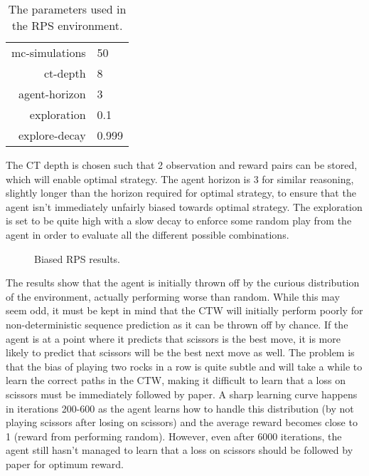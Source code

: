 \documentclass[pdftex,twoside,a4paper]{report}
\begin{document}
\begin{table}[h]
\begin{center}
\begin{tabular}{| r | l | }
\hline
mc-simulations & 50\\
ct-depth & 8\\
agent-horizon & 3\\
exploration & 0.1\\
explore-decay & 0.999\\
\hline
\end{tabular}
\caption{The parameters used in the RPS environment.}
\end{center}
\label{tab:rps_params}
\end{table}

The CT depth is chosen such that 2 observation and reward pairs can be stored, which will enable optimal strategy. The agent horizon is 3 for similar reasoning, slightly longer than the horizon required for optimal strategy, to ensure that the agent isn't immediately unfairly biased towards optimal strategy. The exploration is set to be quite high with a slow decay to enforce some random play from the agent in order to evaluate all the different possible combinations.

\begin{figure}[h]
  \begin{center}
  \end{center}
  \caption{Biased RPS results.}
  \label{fig:rps_results}
\end{figure}

The results show that the agent is initially thrown off by the curious distribution of the environment, actually performing worse than random. While this may seem odd, it must be kept in mind that the CTW will initially perform poorly for non-deterministic sequence prediction as it can be thrown off by chance. If the agent is at a point where it predicts that scissors is the best move, it is more likely to predict that scissors will be the best next move as well. The problem is that the bias of playing two rocks in a row is quite subtle and will take a while to learn the correct paths in the CTW, making it difficult to learn that a loss on scissors must be immediately followed by paper. A sharp learning curve happens in iterations 200-600 as the agent learns how to handle this distribution (by not playing scissors after losing on scissors) and the average reward becomes close to 1 (reward from performing random). However, even after 6000 iterations, the agent still hasn't managed to learn that a loss on scissors should be followed by paper for optimum reward.
\end{document}
